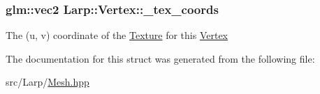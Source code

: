 \subsubsection[{\texorpdfstring{\+\_\+tex\+\_\+coords}{_tex_coords}}]{\setlength{\rightskip}{0pt plus 5cm}glm\+::vec2 Larp\+::\+Vertex\+::\+\_\+tex\+\_\+coords}\hypertarget{structLarp_1_1Vertex_aa3c59b04ad38f2861683c2784bc137fd}{}\label{structLarp_1_1Vertex_aa3c59b04ad38f2861683c2784bc137fd}
The (u, v) coordinate of the \hyperlink{classLarp_1_1Texture}{Texture} for this \hyperlink{structLarp_1_1Vertex}{Vertex} 

The documentation for this struct was generated from the following file\+:\begin{DoxyCompactItemize}
\item 
src/\+Larp/\hyperlink{Mesh_8hpp}{Mesh.\+hpp}\end{DoxyCompactItemize}
